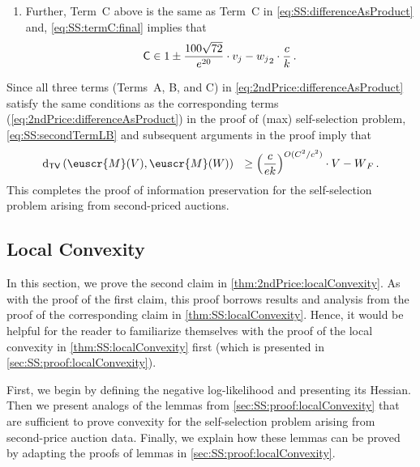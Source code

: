\documentclass[11pt,letterpaper]{article}
\theoremstyle{plain}
\theoremstyle{definition}
\theoremstyle{remark}
\newcommand{\inparen}[1]{\ensuremath{\left(#1\right)}}
\let\norm\relax
\newcommand{\norm}[1]{\ensuremath{\left\lVert #1 \right\rVert}}
\newcommand{\tv}[2]{\operatorname{d}_{\mathsf{TV}}{\inparen{#1,#2}}}
\newcommand{\nfrac}[2]{\nicefrac{#1}{#2}}
\newcommand{\customcal}[1]{\euscr{#1}}
\newcommand{\cM}{\customcal{M}}
\renewcommand{\gamma}{\upgamma}
\begin{document}
{{\begin{enumerate}
\[{                    \frac{5R}{6}\cdot \sqrt{\log{\nfrac{1}{\gamma}}}\cdot \norm{v_i-w_i}_2 
                }
            \,.
        \] 
        \item Further, Term~\textsf{C} above is the same as Term~\textsf{C}  in \cref{eq:SS:differenceAsProduct} and, \cref{eq:SS:termC:final} implies that
        \[
            \textsf{C}\in 1\pm \frac{100\sqrt{72}}{e^{20}} \cdot \norm{v_j-w_j}_2\cdot \frac{c}{k}\,.
        \]
    \end{enumerate}
    Since all three terms (Terms~\textsf{A}, \textsf{B}, and \textsf{C}) in \cref{eq:2ndPrice:differenceAsProduct} satisfy the same conditions as the corresponding terms (\cref{eq:2ndPrice:differenceAsProduct}) in the proof of (max) self-selection problem, \cref{eq:SS:secondTermLB} and subsequent arguments in the proof imply that 
    \[
        \tv{\cM(V)}{\cM(W)}~~
        \geq \inparen{\frac{c}{ek}}^{{O({C^2/c^2}){}}}\cdot \norm{V-W}_F\,.
    \]
    This completes the proof of information preservation for the self-selection problem arising from second-priced auctions.
    
\subsection{Local Convexity}\label{sec:2ndPrice:localConvexity}
    In this section, we prove the second claim in \cref{thm:2ndPrice:localConvexity}.
    As with the proof of the first claim, this proof borrows results and analysis from the proof of the corresponding claim in \cref{thm:SS:localConvexity}.
    Hence, it would be helpful for the reader to familiarize themselves with the proof of the local convexity in \cref{thm:SS:localConvexity} first (which is presented in \cref{sec:SS:proof:localConvexity}).

    First, we begin by defining the negative log-likelihood and presenting its Hessian.
    Then we present analogs of the lemmas from \cref{sec:SS:proof:localConvexity} that are sufficient to prove convexity for the self-selection problem arising from second-price auction data.
    Finally, we explain how these lemmas can be proved by adapting the proofs of lemmas in \cref{sec:SS:proof:localConvexity}.
    

}}
\end{document}

